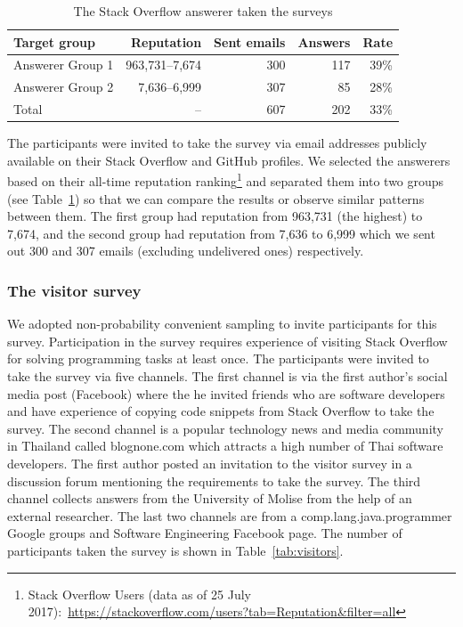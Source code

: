\documentclass{svjour3}                     %
\begin{document}
\begin{table}
	\centering
	\caption{The Stack Overflow answerer taken the surveys}
	\label{tab:answerers}
	\begin{tabular}{lrrrr}
		\toprule
		Target group & Reputation & Sent emails & Answers & Rate \\
		\midrule
		Answerer Group 1 & 963,731--7,674 & 300 & 117 & 39\% \\
		Answerer Group 2 & 7,636--6,999 & 307 & 85 & 28\% \\
		\midrule
		Total & -- & 607 & 202 & 33\% \\
		\bottomrule
	\end{tabular}
\end{table}

The participants were invited to take the survey via email addresses publicly
available on their Stack Overflow and GitHub profiles. We selected the answerers
based on their all-time reputation ranking\footnote{Stack Overflow Users (data as of
	25 July 2017):~\url{https://stackoverflow.com/users?tab=Reputation&filter=all}}
and separated them into two groups (see Table~\ref{tab:answerers}) so that we
can compare the results or observe similar patterns between them. The first
group had reputation from 963,731 (the highest) to 7,674, and the second group
had reputation from 7,636 to 6,999 which we sent out 300 and 307 emails
(excluding undelivered ones) respectively. 

\subsubsection{The visitor survey} 
We adopted non-probability convenient sampling to invite participants for this
survey. Participation in the survey requires experience of
visiting Stack Overflow for solving programming tasks at least once. The
participants were invited to take the survey via five channels. The first
channel is via the first author's social media post (Facebook) where the he
invited friends who are software developers and have experience of copying code
snippets from Stack Overflow to take the survey. The second channel is a popular
technology news and media community in Thailand called \textsf{blognone.com} which
attracts a high number of Thai software developers. The first author posted an
invitation to the visitor survey in a discussion forum mentioning the
requirements to take the survey. The third channel collects answers from the
University of Molise from the help of an external researcher. The last two
channels are from a \textsf{comp.lang.java.programmer} Google groups and Software
Engineering Facebook page. The number of participants taken the survey is shown in
Table~\ref{tab:visitors}.
\end{document}
